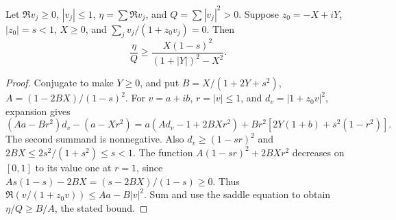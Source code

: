 \begin{lemma}\label{mf:saddle-dual}
Let $\Re v_j\ge0$, $|v_j|\le1$, $\eta=\sum\Re v_j$, and
$Q=\sum|v_j|^2>0$. Suppose $z_0=-X+iY$, $|z_0|=s<1$,
$X\ge0$, and $\sum_jv_j/(1+z_0v_j)=0$. Then
\[
 \frac{\eta}{Q}\ge
 \frac{X(1-s)^2}{(1+|Y|)^2-X^2}.
\]
\end{lemma}
\begin{proof}
Conjugate to make $Y\ge0$, and put
$B=X/(1+2Y+s^2)$, $A=(1-2BX)/(1-s)^2$.
For $v=a+ib$, $r=|v|\le1$, and $d_v=|1+z_0v|^2$, expansion gives
\[
 (Aa-Br^2)d_v-(a-Xr^2)
 =a(Ad_v-1+2BXr^2)
   +Br^2[2Y(1+b)+s^2(1-r^2)].
\]
The second summand is nonnegative. Also $d_v\ge(1-sr)^2$ and
$2BX\le2s^2/(1+s^2)\le s<1$. The function
$A(1-sr)^2+2BXr^2$ decreases on $[0,1]$ to its value one
at $r=1$, since $As(1-s)-2BX=(s-2BX)/(1-s)\ge0$.
Thus $\Re(v/(1+z_0v))\le Aa-B|v|^2$. Sum and use the saddle
equation to obtain $\eta/Q\ge B/A$, the stated bound.
\end{proof}

